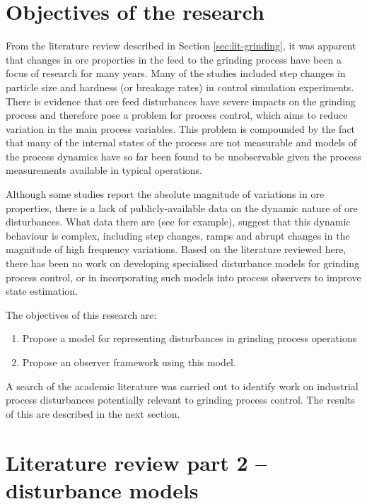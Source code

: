 \section{Objectives of the research} \label{sec:objectives}

From the literature review described in Section \ref{sec:lit-grinding}, it was apparent that changes in ore properties in the feed to the grinding process have been a focus of research for many years. Many of the studies included step changes in particle size and hardness (or breakage rates) in control simulation experiments. There is evidence that ore feed disturbances have severe impacts on the grinding process and therefore pose a problem for process control, which aims to reduce variation in the main process variables. This problem is compounded by the fact that many of the internal states of the process are not measurable and models of the process dynamics have so far been found to be unobservable given the process measurements available in typical operations. 

Although some studies report the absolute magnitude of variations in ore properties, there is a lack of publicly-available data on the dynamic nature of ore disturbances. What data there are (see \cite{steyn_investigating_2018} for example), suggest that this dynamic behaviour is complex, including step changes, ramps and abrupt changes in the magnitude of high frequency variations. Based on the literature reviewed here, there has been no work on developing specialised disturbance models for grinding process control, or in incorporating such models into process observers to improve state estimation.

The objectives of this research are:
\begin{enumerate}
	\item Propose a model for representing disturbances in grinding process operations
	\item Propose an observer framework using this model.
\end{enumerate}
A search of the academic literature was carried out to identify work on industrial process disturbances potentially relevant to grinding process control. The results of this are described in the next section.


\section{Literature review part 2 – disturbance models} \label{sec:lit-disturb-models}

